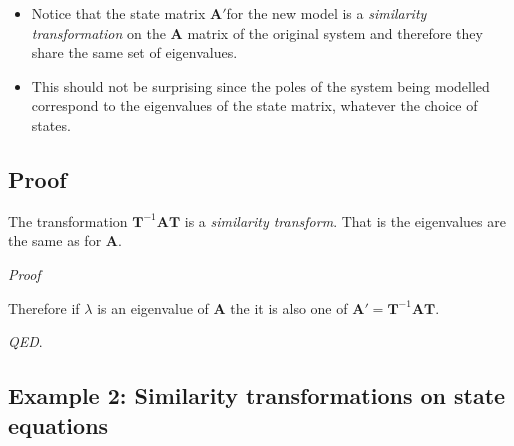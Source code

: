 \begin{itemize}
	\item Notice that the state matrix $\mathbf{A}'$for the new model is a \emph{similarity transformation} on the $\mathbf{A}$ matrix of the original system and therefore they share the same set of eigenvalues.
	\item This should not be surprising since the poles of the system being modelled correspond to the eigenvalues of the state matrix, whatever the choice of states.
\end{itemize}



\subsection*{Proof} %
\label{sub:invariance_of_system_transformation}


\ifslidesonly
\begin{slide}
	The transformation $\mathbf{T}^{-1}\mathbf{AT}$ is a \emph{similarity transform}. That is the eigenvalues are the same as for $\mathbf{A}$.
	
\emph{Proof}
   
\end{slide}
\fi

Therefore if $\lambda$ is an eigenvalue of $\mathbf{A}$ the it is also one of $\mathbf{A}'=\mathbf{T}^{-1}\mathbf{AT}$. 

\emph{QED}.


\subsection*{Example 2: Similarity transformations on state equations}
\label{sub:similarity_transforms_on_state_equations}

